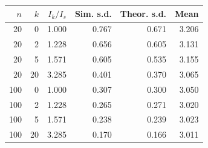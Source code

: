 \begin{tabular}{rrrrrr}
\toprule
$n$ & $k$ & $I_k/I_s$ & Sim. s.d. & Theor. s.d. & Mean \\
\midrule
20 & 0 & 1.000 & 0.767 & 0.671 & 3.206 \\
20 & 2 & 1.228 & 0.656 & 0.605 & 3.131 \\
20 & 5 & 1.571 & 0.605 & 0.535 & 3.155 \\
20 & 20 & 3.285 & 0.401 & 0.370 & 3.065 \\
100 & 0 & 1.000 & 0.307 & 0.300 & 3.050 \\
100 & 2 & 1.228 & 0.265 & 0.271 & 3.020 \\
100 & 5 & 1.571 & 0.238 & 0.239 & 3.023 \\
100 & 20 & 3.285 & 0.170 & 0.166 & 3.011 \\
\bottomrule
\end{tabular}
